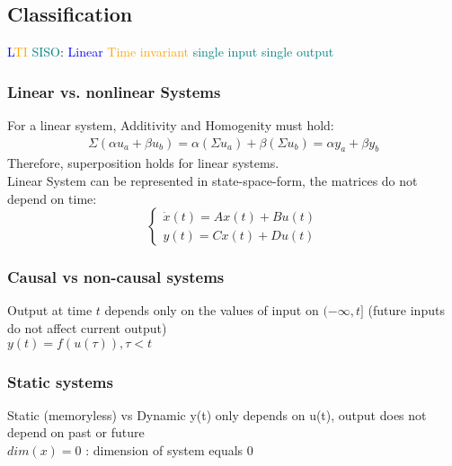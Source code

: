 \subsection{Classification}
    \textcolor{blue}{L}\textcolor{orange}{TI} \textcolor{teal}{SISO}: \textcolor{blue}{Linear} \textcolor{orange}{Time invariant} \textcolor{teal}{single input single output}
    \subsubsection*{Linear vs. nonlinear Systems}
        For a linear system, Additivity and Homogenity must hold:
        \begin{align*}
            \Sigma (\alpha u_a + \beta u_b) = \alpha (\Sigma u_a) + \beta (\Sigma u_b) = \alpha y_a + \beta y_b
        \end{align*}
        Therefore, superposition holds for linear systems.\\
        Linear System can be represented in state-space-form, the matrices do not depend on time:
        \begin{equation}\label{eqn:LTI}
            \begin{cases}
                \dot{x}(t) = Ax(t) + Bu(t)\\
                y(t) = Cx(t) + Du(t)
            \end{cases}
        \end{equation}

    \subsubsection*{Causal vs non-causal systems}
        Output at time $t$ depends only on the values of input on $(-\infty, t]$ (future inputs do not affect current output)\\
        $y(t) = f(u(\tau)), \tau < t$
    
    \subsubsection*{Static systems}
        Static (memoryless) vs Dynamic
        y(t) only depends on u(t), output does not depend on past or future\\
        $dim(x) = 0$ : dimension of system equals 0

